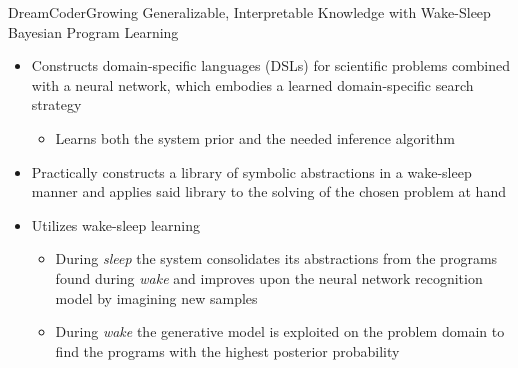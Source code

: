 \documentclass[AERbeamer%
              ,optEnglish%
              ,optBiber%
              ,optBibstyleAlphabetic%
              ,optBeamerClassicFormat%
              ]{AERlatex}%
\begin{document}
\begin{frame}[c]{DreamCoder}{Growing Generalizable, Interpretable Knowledge with Wake-Sleep Bayesian Program Learning}
    \centering
    \begin{itemize}
        \item Constructs domain-specific languages (DSLs) for scientific problems combined with a neural network,
              which embodies a learned domain-specific search strategy
        \begin{itemize}
            \item Learns both the system prior and the needed inference algorithm
        \end{itemize}
        \item Practically constructs a library of symbolic abstractions in a wake-sleep manner and applies said library
              to the solving of the chosen problem at hand
        \item Utilizes wake-sleep learning %
        \begin{itemize}
            \item During \textit{sleep} the system consolidates its abstractions from the programs found during \textit{wake}
                  and improves upon the neural network recognition model by imagining new samples
            \item During \textit{wake} the generative model is exploited on the problem domain to find the programs with the
                  highest posterior probability
        \end{itemize}
    \end{itemize}
\end{frame}
\end{document}
